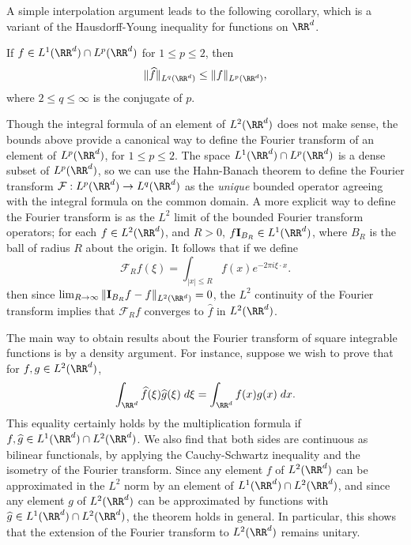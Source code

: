 A simple interpolation argument leads to the following corollary, which is a variant of the Hausdorff-Young inequality for functions on $\RR^d$.

\begin{corollary} If $f \in L^1(\RR^d) \cap L^p(\RR^d)$ for $1 \leq p \leq 2$, then
    \[ \| \widehat{f} \|_{L^q(\RR^d)} \leq \| f \|_{L^p(\RR^d)}, \]
    where $2 \leq q \leq \infty$ is the conjugate of $p$.
\end{corollary}

Though the integral formula of an element of $L^2(\RR^d)$ does not make sense, the bounds above provide a canonical way to define the Fourier transform of an element of $L^p(\RR^d)$, for $1 \leq p \leq 2$. The space $L^1(\RR^d) \cap L^p(\RR^d)$ is a dense subset of $L^p(\RR^d)$, so we can use the Hahn-Banach theorem to define the Fourier transform $\mathcal{F}: L^p(\RR^d) \to L^q(\RR^d)$ as the {\it unique} bounded operator agreeing with the integral formula on the common domain. A more explicit way to define the Fourier transform is as the $L^2$ limit of the bounded Fourier transform operators; for each $f \in L^2(\RR^d)$, and $R > 0$, $f \mathbf{I}_{B_R} \in L^1(\RR^d)$, where $B_R$ is the ball of radius $R$ about the origin. It follows that if we define
%
\[ \mathcal{F}_R f (\xi) = \int_{|x| \leq R} f(x) e^{-2 \pi i \xi \cdot x}. \]
%
then since $\lim_{R \to \infty} \| \mathbf{I}_{B_R} f - f \|_{L^2(\RR^d)} = 0$, the $L^2$ continuity of the Fourier transform implies that $\mathcal{F}_R f$ converges to $\widehat{f}$ in $L^2(\RR^d)$.

The main way to obtain results about the Fourier transform of square integrable functions is by a density argument. For instance, suppose we wish to prove that for $f,g \in L^2(\RR^d)$,
%
\[ \int_{\RR^d} \widehat{f}(\xi) \widehat{g}(\xi)\; d\xi = \int_{\RR^d} f(x) g(x)\; dx. \]
%
This equality certainly holds by the multiplication formula if $f,\widehat{g} \in L^1(\RR^d) \cap L^2(\RR^d)$. We also find that both sides are continuous as bilinear functionals, by applying the Cauchy-Schwartz inequality and the isometry of the Fourier transform. Since any element $f$ of $L^2(\RR^d)$ can be approximated in the $L^2$ norm by an element of $L^1(\RR^d) \cap L^2(\RR^d)$, and since any element $g$ of $L^2(\RR^d)$ can be approximated by functions with $\widehat{g} \in L^1(\RR^d) \cap L^2(\RR^d)$, the theorem holds in general. In particular, this shows that the extension of the Fourier transform to $L^2(\RR^d)$ remains unitary.

